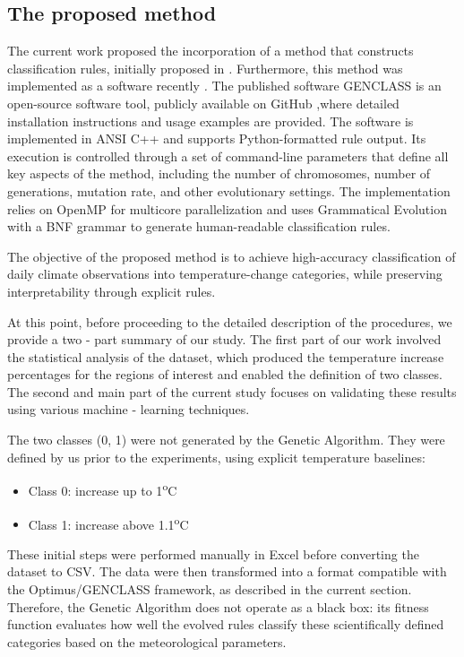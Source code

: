 \documentclass[12pt]{Definitions/academia}
\begin{document}
\subsection{\textmd{The proposed method\label{subsec:The-proposed-method}}}

The current work proposed the incorporation of a method that constructs
classification rules, initially proposed in \textit{\cite{Tsoulos 2020}.}
Furthermore, this method was implemented as a software recently \textit{\cite{Anastasopoulos 2021}.}
The published software GENCLASS is an open\nobreakdash-source software
tool, publicly available on GitHub \cite{GitHub},where detailed installation 
instructions and usage examples are provided.
The software is implemented in ANSI C++ and supports Python\nobreakdash-formatted
rule output. Its execution is controlled through a set of command\nobreakdash-line
parameters that define all key aspects of the method, including the
number of chromosomes, number of generations, mutation rate, and other
evolutionary settings. The implementation relies on OpenMP for multicore
parallelization and uses Grammatical Evolution with a BNF grammar
to generate human\nobreakdash-readable classification rules.

The objective of the proposed method is to achieve high-accuracy classification
of daily climate observations into temperature-change categories,
while preserving interpretability through explicit rules.

At this point, before proceeding to the detailed description of the procedures, we provide a two - part summary of our study. The first part of our work involved the statistical analysis of the dataset, which produced the temperature increase percentages for the regions of interest and enabled the definition of two classes. The second and main part of the current study focuses on validating these results using various machine - learning techniques.

The two classes (0, 1) were not generated by the Genetic Algorithm. They were defined by us prior to the experiments, using explicit temperature baselines:
\begin{itemize}
	\item Class 0: increase up to 1\textsuperscript{o}C
	\item Class 1: increase above 1.1\textsuperscript{o}C
	\end{itemize}

These initial steps were performed manually in Excel before converting the dataset to CSV. The data were then transformed into a format compatible with the Optimus/GENCLASS framework, as described in the current section.
Therefore, the Genetic Algorithm does not operate as a black box: its fitness function evaluates how well the evolved rules classify these scientifically defined categories based on the meteorological parameters.
\end{document}
